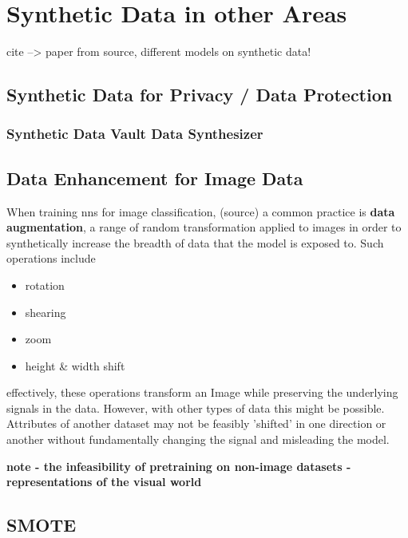 \chapter{Synthetic Data in other Areas}

cite --> paper from source, different models on synthetic data!

\section{Synthetic Data for Privacy / Data Protection}

\subsection{Synthetic Data Vault Data Synthesizer}

\section{Data Enhancement for Image Data}

When training \acp{nn} for image classification, (source) a common practice is \textbf{data augmentation}, a range of random transformation applied to images in order to synthetically increase the breadth of data that the model is exposed to. 
Such operations include 
\begin{itemize}
	\item rotation
	\item shearing
	\item zoom
	\item height \& width shift
\end{itemize}

effectively, these operations transform an Image while preserving the underlying signals in the data. However, with other types of data this might be possible. Attributes of another dataset may not be feasibly 'shifted' in one direction or another without fundamentally changing the signal and misleading the model.

\textbf{note - the infeasibility of pretraining on non-image datasets - representations of the visual world}

\section{SMOTE}


